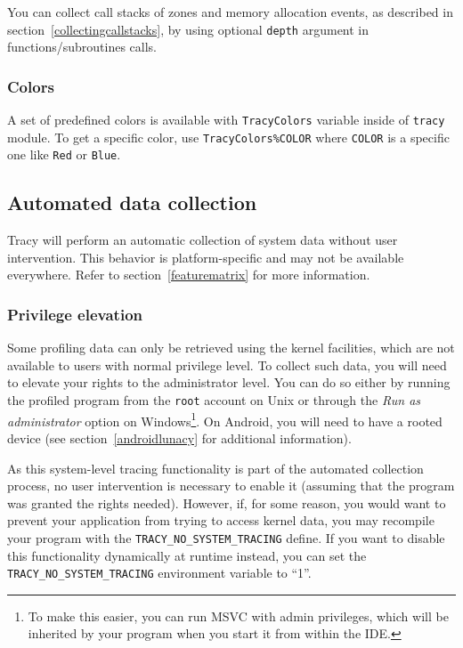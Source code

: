 \documentclass[hidelinks,titlepage,a4paper,twoside]{article}
\begin{document}
You can collect call stacks of zones and memory allocation events, as described in section~\ref{collectingcallstacks}, by using optional \texttt{depth} argument in functions/subroutines calls.

\subsubsection{Colors}

A set of predefined colors is available with \texttt{TracyColors} variable inside of \texttt{tracy} module.
To get a specific color, use \texttt{TracyColors\%COLOR} where \texttt{COLOR} is a specific one like \texttt{Red} or \texttt{Blue}.


\subsection{Automated data collection}
\label{automated}

Tracy will perform an automatic collection of system data without user intervention. This behavior is platform-specific and may not be available everywhere. Refer to section~\ref{featurematrix} for more information.

\subsubsection{Privilege elevation}
\label{privilegeelevation}

Some profiling data can only be retrieved using the kernel facilities, which are not available to users with normal privilege level. To collect such data, you will need to elevate your rights to the administrator level. You can do so either by running the profiled program from the \texttt{root} account on Unix or through the \emph{Run as administrator} option on Windows\footnote{To make this easier, you can run MSVC with admin privileges, which will be inherited by your program when you start it from within the IDE.}. On Android, you will need to have a rooted device (see section~\ref{androidlunacy} for additional information).

As this system-level tracing functionality is part of the automated collection process, no user intervention is necessary to enable it (assuming that the program was granted the rights needed). However, if, for some reason, you would want to prevent your application from trying to access kernel data, you may recompile your program with the \texttt{TRACY\_NO\_SYSTEM\_TRACING} define. If you want to disable this functionality dynamically at runtime instead, you can set the \texttt{TRACY\_NO\_SYSTEM\_TRACING} environment variable to \enquote{1}.
\end{document}

